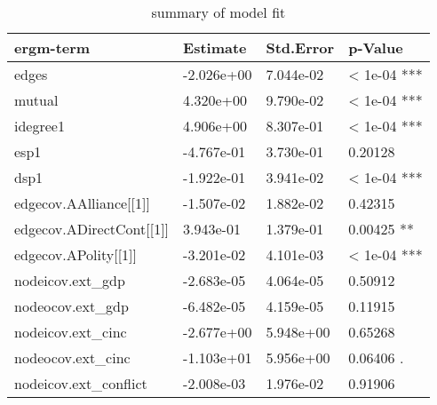 \documentclass{article}
\begin{document}
\begin{table}[h]
	\centering
	\caption{summary of model fit}
		\begin{tabular}{l|l|l|l}
		
		\hline
		ergm-term 						    & Estimate      & Std.Error   & p-Value 				\\
		\hline
    edges                     & -2.026e+00    & 7.044e-02   &    < 1e-04 ***  \\
    mutual                    &  4.320e+00    & 9.790e-02   &    < 1e-04 ***  \\
    idegree1                  &  4.906e+00    & 8.307e-01   &    < 1e-04 ***  \\
    esp1                      & -4.767e-01    & 3.730e-01   &    0.20128      \\
    dsp1                      & -1.922e-01    & 3.941e-02   &    < 1e-04 ***  \\
    edgecov.AAlliance[[1]]    & -1.507e-02    & 1.882e-02   &    0.42315      \\
    edgecov.ADirectCont[[1]]  &  3.943e-01    & 1.379e-01   &    0.00425 **   \\
    edgecov.APolity[[1]]      & -3.201e-02    & 4.101e-03   &    < 1e-04 ***  \\
    nodeicov.ext_gdp          & -2.683e-05    & 4.064e-05   &    0.50912      \\
    nodeocov.ext_gdp          & -6.482e-05    & 4.159e-05   &    0.11915      \\
    nodeicov.ext_cinc         & -2.677e+00    & 5.948e+00   &    0.65268      \\
    nodeocov.ext_cinc         & -1.103e+01    & 5.956e+00   &    0.06406 .    \\
    nodeicov.ext_conflict     & -2.008e-03    & 1.976e-02   &    0.91906      \\

		\hline
						
		\end{tabular}
	
	
\end{table}
\end{document}
